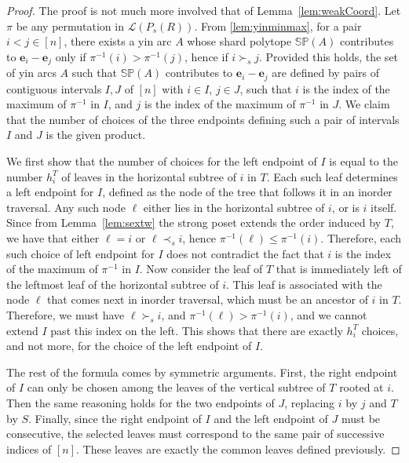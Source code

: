 \documentclass{amsart}
\theoremstyle{definition}
\renewcommand{\b}[1]{{\boldsymbol{#1}}} %
\newcommand{\polytope}[1]{\mathds{#1}} %
\newcommand{\SP}{\polytope{SP}}
\begin{document}
\begin{proof}
  The proof is not much more involved that of Lemma~\ref{lem:weakCoord}.
  Let $\pi$ be any permutation in $\mathcal{L}(P_s(R))$.
  From \cref{lem:yinminmax}, for a pair $i<j \in [n]$, there exists a yin arc $A$ whose shard polytope $\SP(A)$ contributes to $\b{e}_i-\b{e}_j$ only if $\pi^{-1}(i)>\pi^{-1}(j)$, hence if $i\succ_s j$.
  Provided this holds, the set of yin arcs $A$ such that $\SP(A)$ contributes to $\b{e}_i-\b{e}_j$ are defined by pairs of contiguous intervals $I,J$ of $[n]$ with $i\in I$, $j\in J$, such that $i$ is the index of the maximum of $\pi^{-1}$ in $I$, and $j$ is the index of the maximum of $\pi^{-1}$ in $J$.
  We claim that the number of choices of the three endpoints defining such a pair of intervals $I$ and $J$ is the given product.

  We first show that the number of choices for the left endpoint of $I$ is equal to the number $h^T_i$ of leaves in the horizontal subtree of $i$ in $T$.
  Each such leaf determines a left endpoint for $I$, defined as the node of the tree that follows it in an inorder traversal.
  Any such node $\ell$ either lies in the horizontal subtree of $i$, or is $i$ itself.
  Since from Lemma~\ref{lem:sextw} the strong poset extends the order induced by $T$, we have that either $\ell=i$ or $\ell\prec_s i$, hence $\pi^{-1}(\ell)\leq \pi^{-1}(i)$.
  Therefore, each such choice of left endpoint for $I$ does not contradict the fact that $i$ is the index of the maximum of $\pi^{-1}$ in $I$.
  Now consider the leaf of $T$ that is immediately left of the leftmost leaf of the horizontal subtree of $i$.
  This leaf is associated with the node $\ell$ that comes next in inorder traversal, which must be an ancestor of $i$ in $T$.
  Therefore, we must have $\ell\succ_s i$, and $\pi^{-1}(\ell) > \pi^{-1}(i)$, and we cannot extend $I$ past this index on the left.
  This shows that there are exactly $h^T_i$ choices, and not more, for the choice of the left endpoint of $I$.

  The rest of the formula comes by symmetric arguments.
  First, the right endpoint of $I$ can only be chosen among the leaves of the vertical subtree of $T$ rooted at $i$.
  Then the same reasoning holds for the two endpoints of $J$, replacing $i$ by $j$ and $T$ by $S$.
  Finally, since the right endpoint of $I$ and the left endpoint of $J$ must be consecutive, the selected leaves must correspond to the same pair of successive indices of $[n]$.
  These leaves are exactly the common leaves defined previously.
\end{proof}
\end{document}
